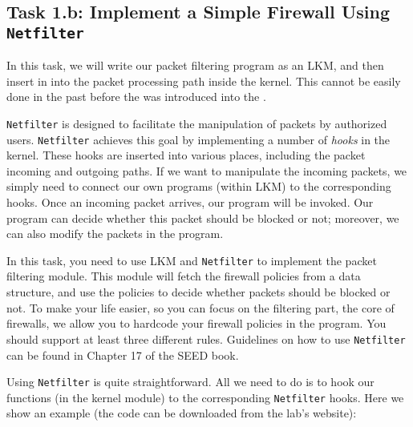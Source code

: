 \subsection{Task 1.b: Implement a Simple Firewall Using \texttt{Netfilter}}  


In this task, we will write our packet filtering program
as an LKM, and then insert in into the packet processing path
inside the kernel. This cannot be easily done in the past before 
the \Netfilter was introduced into the \linux.

{\tt Netfilter} is designed to facilitate the manipulation of 
packets by authorized users. {\tt Netfilter} achieves this 
goal by implementing a number of {\em hooks} in the 
\linux kernel. These hooks are inserted into various places, 
including the packet incoming and outgoing paths. 
If we want to manipulate the incoming packets, we simply
need to connect our own programs (within LKM) to the 
corresponding hooks. Once an incoming packet arrives, 
our program will be invoked. Our program can decide 
whether this packet should be blocked or not; moreover,
we can also modify the packets in the program.


In this task, you need to use LKM and {\tt Netfilter} to implement
the packet filtering module.  This module will fetch 
the firewall policies from a data structure, and use the 
policies to decide whether packets should be blocked or not.
To make your life easier, so you can focus on the filtering part, 
the core of firewalls, we allow you to hardcode your firewall policies 
in the program. You should support at least three different 
rules. Guidelines on how to use \texttt{Netfilter} can be 
found in Chapter 17 of the SEED book.


Using {\tt Netfilter} is quite straightforward. All we need to do
is to hook our functions (in the kernel module) to the corresponding
{\tt Netfilter} hooks. Here we show an example (the code can
be downloaded from the lab's website):


